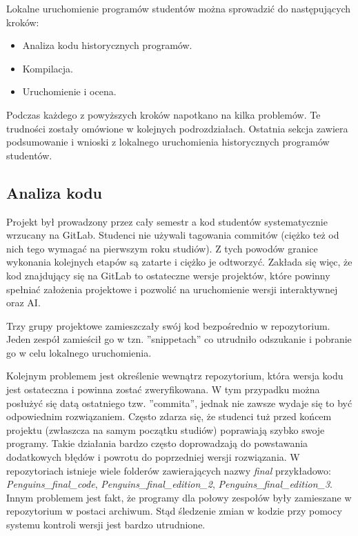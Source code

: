 Lokalne uruchomienie programów studentów można sprowadzić do następujących kroków:
\begin{itemize}
    \item Analiza kodu historycznych programów.
    \item Kompilacja.
    \item Uruchomienie i ocena.
\end{itemize}

Podczas każdego z powyższych kroków napotkano na kilka problemów.
Te trudności zostały omówione w kolejnych podrozdziałach.
Ostatnia sekcja zawiera podsumowanie i wnioski z lokalnego uruchomienia historycznych programów studentów.

\subsection{Analiza kodu}

Projekt był prowadzony przez cały semestr a kod studentów systematycznie wrzucany na GitLab.
Studenci nie używali tagowania commitów (ciężko też od nich tego wymagać na pierwszym roku studiów).
Z tych powodów granice wykonania kolejnych etapów są zatarte i ciężko je odtworzyć.
Zakłada się więc, że kod znajdujący się na GitLab to ostateczne wersje projektów, które powinny spełniać założenia projektowe i pozwolić na uruchomienie wersji interaktywnej oraz AI.

Trzy grupy projektowe zamieszczały swój kod bezpośrednio w repozytorium.
Jeden zespół zamieścił go w tzn. ”snippetach” co utrudniło odszukanie i pobranie go w celu lokalnego uruchomienia.

Kolejnym problemem jest określenie wewnątrz repozytorium, która wersja kodu jest ostateczna i powinna zostać zweryfikowana.
W tym przypadku można posłużyć się datą ostatniego tzw. ”commita”, jednak nie zawsze wydaje się to być odpowiednim rozwiązaniem.
Często zdarza się, że studenci tuż przed końcem projektu (zwłaszcza na samym początku studiów) poprawiają szybko swoje programy.
Takie działania bardzo często doprowadzają do powstawania dodatkowych błędów i powrotu do poprzedniej wersji rozwiązania.
W repozytoriach istnieje wiele folderów zawierających nazwy \textit{final} przykładowo: \textit{Penguins\_final\_code}, \textit{Penguins\_final\_edition\_2}, \textit{Penguins\_final\_edition\_3}.
Innym problemem jest fakt, że programy dla połowy zespołów były zamieszane w repozytorium w postaci archiwum.
Stąd śledzenie zmian w kodzie przy pomocy systemu kontroli wersji jest bardzo utrudnione.

